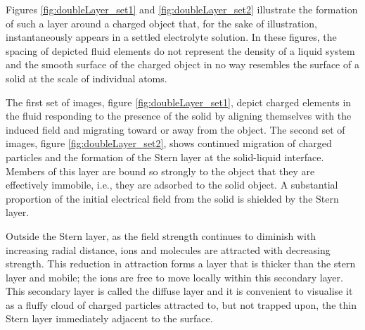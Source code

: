     Figures \ref{fig:doubleLayer_set1} and \ref{fig:doubleLayer_set2} illustrate the formation of such a layer around a charged object that, for the sake of illustration, instantaneously appears in a settled electrolyte solution. In these figures, the spacing of depicted fluid elements do not represent the density of a liquid system and the smooth surface of the charged object in no way resembles the surface of a solid at the scale of individual atoms.

    The first set of images, figure \ref{fig:doubleLayer_set1}, depict charged elements in the fluid responding to the presence of the solid by aligning themselves with the induced field and migrating toward or away from the object. The second set of images, figure \ref{fig:doubleLayer_set2}, shows continued migration of charged particles and the formation of the Stern layer at the solid-liquid interface. Members of this layer are bound so strongly to the object that they are effectively immobile, i.e., they are adsorbed to the solid object. A substantial proportion of the initial electrical field from the solid is shielded by the Stern layer.

    Outside the Stern layer, as the field strength continues to diminish with increasing radial distance, ions and molecules are attracted with decreasing strength. This reduction in attraction forms a layer that is thicker than the stern layer and mobile; the ions are free to move locally within this secondary layer. This secondary layer is called the diffuse layer and it is convenient to visualise it as a fluffy cloud of charged particles attracted to, but not trapped upon, the thin Stern layer immediately adjacent to the surface.

